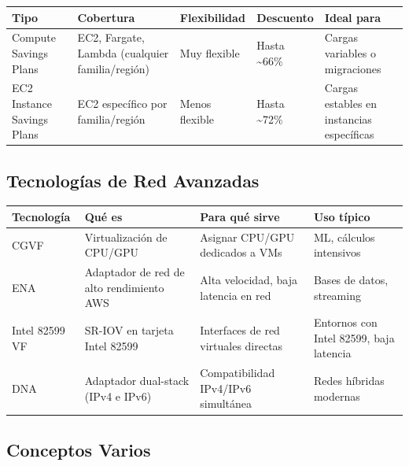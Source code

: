 \documentclass[12pt,a4paper]{report}
\begin{document}
\begin{center}
\begin{longtable}{|p{3cm}|p{4cm}|p{3cm}|p{2.5cm}|p{3cm}|}
\hline
\cellcolor{awsblue!20}\textbf{Tipo} & \cellcolor{awsblue!20}\textbf{Cobertura} & \cellcolor{awsblue!20}\textbf{Flexibilidad} & \cellcolor{awsblue!20}\textbf{Descuento} & \cellcolor{awsblue!20}\textbf{Ideal para} \\
\hline
\cellcolor{successgreen!20}Compute Savings Plans & EC2, Fargate, Lambda (cualquier familia/región) & Muy flexible & Hasta \textasciitilde 66\% & Cargas variables o migraciones \\
\hline
EC2 Instance Savings Plans & EC2 específico por familia/región & Menos flexible & Hasta \textasciitilde 72\% & Cargas estables en instancias específicas \\
\hline
\end{longtable}
\end{center}

\subsection{Tecnologías de Red Avanzadas}

\begin{center}
\begin{longtable}{|p{3cm}|p{4cm}|p{4cm}|p{4cm}|}
\hline
\cellcolor{awsblue!20}\textbf{Tecnología} & \cellcolor{awsblue!20}\textbf{Qué es} & \cellcolor{awsblue!20}\textbf{Para qué sirve} & \cellcolor{awsblue!20}\textbf{Uso típico} \\
\hline
CGVF & Virtualización de CPU/GPU & Asignar CPU/GPU dedicados a VMs & ML, cálculos intensivos \\
\hline
\cellcolor{successgreen!20}ENA & Adaptador de red de alto rendimiento AWS & Alta velocidad, baja latencia en red & Bases de datos, streaming \\
\hline
Intel 82599 VF & SR-IOV en tarjeta Intel 82599 & Interfaces de red virtuales directas & Entornos con Intel 82599, baja latencia \\
\hline
DNA & Adaptador dual-stack (IPv4 e IPv6) & Compatibilidad IPv4/IPv6 simultánea & Redes híbridas modernas \\
\hline
\end{longtable}
\end{center}

\subsection{Conceptos Varios}
\end{document}
